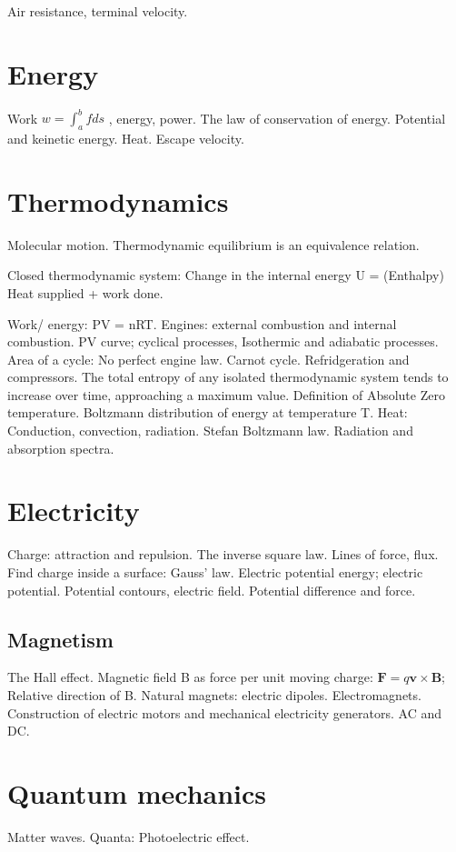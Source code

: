 \documentclass{article}
\begin{document}
Air resistance, terminal velocity.

\section{Energy}
Work $w = \int_{a}^{b}fds$ , energy, power. The law of conservation of energy. Potential and keinetic energy. Heat. Escape velocity.

\section{Thermodynamics}
Molecular motion. Thermodynamic equilibrium is an equivalence relation.

Closed thermodynamic system: Change in the internal energy U = (Enthalpy) Heat supplied + work done.

Work/ energy: PV = nRT. Engines: external combustion and internal combustion. PV curve; cyclical processes, Isothermic and adiabatic processes. Area of a cycle: No perfect engine law. Carnot cycle. Refridgeration and compressors. The total entropy of any isolated thermodynamic system tends to increase over time, approaching a maximum value. Definition of Absolute Zero temperature. Boltzmann distribution of energy at temperature T. Heat: Conduction, convection, radiation. Stefan Boltzmann law. Radiation and absorption spectra.

\section{Electricity}
Charge: attraction and repulsion. The inverse square law. Lines of force, flux. Find charge inside a surface: Gauss' law. Electric potential energy; electric potential. Potential contours, electric field. Potential difference and force.

\subsection{Magnetism}
The Hall effect. Magnetic field B as force per unit moving charge: $\textbf{F} = q\textbf{v}\times\textbf{B}$; Relative direction of B. Natural magnets: electric dipoles. Electromagnets. Construction of electric motors and mechanical electricity generators. AC and DC.

\section{Quantum mechanics}
Matter waves. Quanta: Photoelectric effect.
\end{document}
